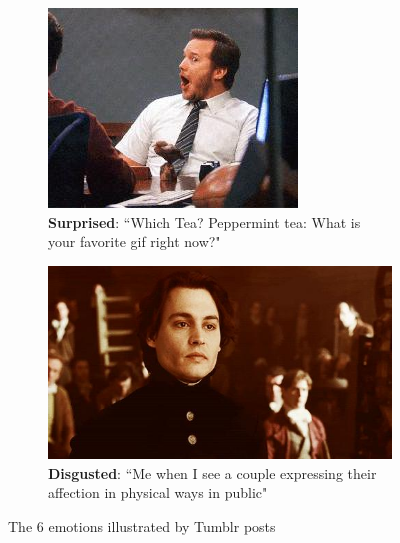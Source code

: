 \begin{figure}
\begin{subfigure}[t]{.5\textwidth}
  \includegraphics[width=.8\linewidth]{Images/surprised.jpg}
  \caption{\textbf{Surprised}: ``Which Tea? Peppermint tea: What is your favorite gif right now?"}
\end{subfigure}
\begin{subfigure}[t]{.5\textwidth}
  \vskip 0pt 
  \centering
  \includegraphics[width=.8\linewidth]{Images/disgusted.jpg}
  \caption{\textbf{Disgusted}: ``Me when I see a couple expressing their affection in physical ways in public"}
\end{subfigure}
\caption{The 6 emotions illustrated by Tumblr posts \cite{tumblr-photos}}
\end{figure}